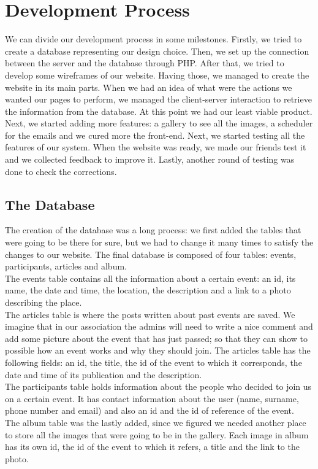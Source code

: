 \documentclass[a4paper]{article}
\begin{document}
	\section{Development Process}
	We can divide our development process in some milestones. Firstly, we tried to create a database representing our design choice. Then, we set up the connection between the server and the database through PHP. After that, we tried to develop some wireframes of our website. Having those, we managed to create the website in its main parts. When we had an idea of what were the actions we wanted our pages to perform, we managed the client-server interaction to retrieve the information from the database. At this point we had our least viable product.  Next, we started adding more features: a gallery to see all the images, a scheduler for the emails and we cured more the front-end. Next, we started testing all the features of our system. When the website was ready, we made our friends test it and we collected feedback to improve it. Lastly, another round of testing was done to check the corrections.
	
	\subsection{The Database}
	The creation of the database was a long process: we first added the tables that were going to be there for sure, but we had to change it many times to satisfy the changes to our website. The final database is composed of four tables: events, participants, articles and album.\\
	The events table contains all the information about a certain event: an id, its name, the date and time, the location, the description and a link to a photo describing the place.\\
	The articles table is where the posts written about past events are saved. We imagine that in our association the admins will need to write a nice comment and add some picture about the event that has just passed; so that they can show to possible how an event works and why they should join. The articles table has the following fields: an id, the title, the id of the event to which it corresponds, the date and time of its publication and the description.\\
	The participants table holds information about the people who decided to join us on a certain event. It has contact information about the user (name, surname, phone number and email) and also an id and the id of reference of the event.\\
	The album table was the lastly added, since we figured we needed another place to store all the images that were going to be in the gallery. Each image in album has its own id, the id of the event to which it refers, a title and the link to the photo.
	
\end{document}
